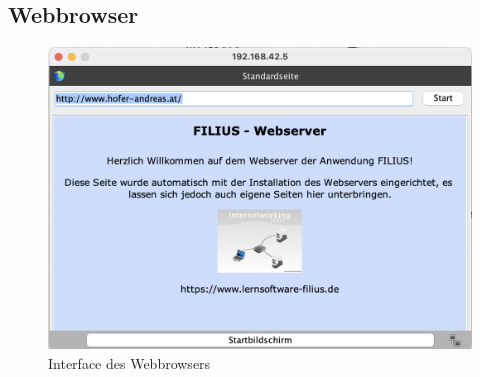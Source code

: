 \documentclass{article}
\begin{document}
	\subsection{Webbrowser}
	\begin{figure}[H]
	\centering
	\includegraphics[scale=0.4]{3.5.png}
	\caption{Interface des Webbrowsers}
	\end{figure}
	
	
	
	
	
	
	
	
	
	
\end{document}

